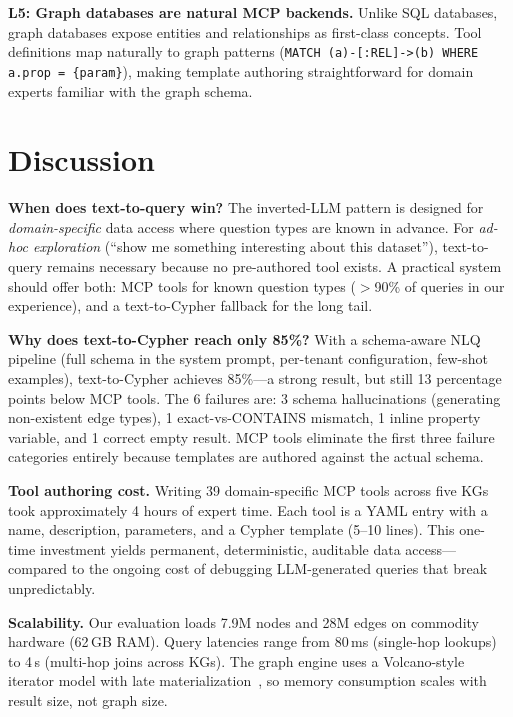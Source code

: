 \documentclass[sigconf, anonymous, review]{acmart}
\begin{document}
\smallskip\noindent\textbf{L5: Graph databases are natural
MCP backends.}
Unlike SQL databases, graph databases expose entities and
relationships as first-class concepts.  Tool definitions
map naturally to graph patterns (\texttt{MATCH (a)-[:REL]->(b)
WHERE a.prop = \{param\}}), making template authoring
straightforward for domain experts familiar with the graph
schema.

\section{Discussion}\label{sec:discussion}

\smallskip\noindent\textbf{When does text-to-query win?}
The inverted-LLM pattern is designed for \emph{domain-specific}
data access where question types are known in advance.
For \emph{ad-hoc exploration} (``show me something interesting
about this dataset''), text-to-query remains necessary because
no pre-authored tool exists.  A practical system should offer
both: MCP tools for known question types ($>$90\% of queries in
our experience), and a text-to-Cypher fallback for the long tail.

\smallskip\noindent\textbf{Why does text-to-Cypher reach only 85\%?}
With a schema-aware NLQ pipeline (full schema in the system
prompt, per-tenant configuration, few-shot examples),
text-to-Cypher achieves 85\%---a strong result, but still
13 percentage points below MCP tools.  The 6 failures are:
3 schema hallucinations (generating non-existent edge types),
1 exact-vs-CONTAINS mismatch, 1 inline property variable,
and 1 correct empty result.  MCP tools eliminate the first
three failure categories entirely because templates are
authored against the actual schema.

\smallskip\noindent\textbf{Tool authoring cost.}
Writing 39 domain-specific MCP tools across five KGs took
approximately 4 hours of expert time.  Each tool is a YAML
entry with a name, description, parameters, and a Cypher
template (5--10 lines).  This one-time investment yields
permanent, deterministic, auditable data access---compared
to the ongoing cost of debugging LLM-generated queries that
break unpredictably.

\smallskip\noindent\textbf{Scalability.}
Our evaluation loads 7.9M nodes and 28M edges on commodity
hardware (62\,GB RAM).  Query latencies range from 80\,ms
(single-hop lookups) to 4\,s (multi-hop joins across KGs).
The graph engine uses a Volcano-style iterator model with
late materialization~\cite{anon2026graphdb}, so memory
consumption scales with result size, not graph size.
\end{document}
